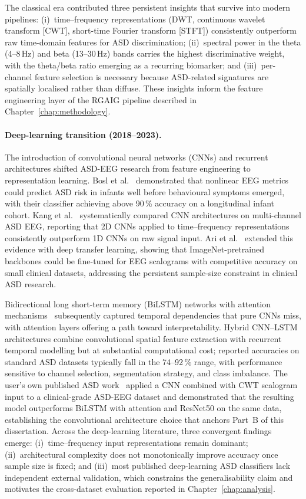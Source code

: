 The classical era contributed three persistent insights that survive into modern pipelines: (i)~time--frequency representations (DWT, continuous wavelet transform [CWT], short-time Fourier transform [STFT]) consistently outperform raw time-domain features for ASD discrimination; (ii)~spectral power in the theta (4--8\,Hz) and beta (13--30\,Hz) bands carries the highest discriminative weight, with the theta/beta ratio emerging as a recurring biomarker; and (iii)~per-channel feature selection is necessary because ASD-related signatures are spatially localised rather than diffuse. These insights inform the feature engineering layer of the RGAIG pipeline described in Chapter~\ref{chap:methodology}.

\paragraph{Deep-learning transition (2018--2023).}
The introduction of convolutional neural networks (CNNs) and recurrent architectures shifted ASD-EEG research from feature engineering to representation learning. Bosl et al.~\cite{bosl2018eeg} demonstrated that nonlinear EEG metrics could predict ASD risk in infants well before behavioural symptoms emerged, with their classifier achieving above 90\,\% accuracy on a longitudinal infant cohort. Kang et al.~\cite{kang2020asd} systematically compared CNN architectures on multi-channel ASD EEG, reporting that 2D CNNs applied to time--frequency representations consistently outperform 1D CNNs on raw signal input. Ari et al.~\cite{ari2022asd} extended this evidence with deep transfer learning, showing that ImageNet-pretrained backbones could be fine-tuned for EEG scalograms with competitive accuracy on small clinical datasets, addressing the persistent sample-size constraint in clinical ASD research.

Bidirectional long short-term memory (BiLSTM) networks with attention mechanisms~\cite{ahmad2020eeg} subsequently captured temporal dependencies that pure CNNs miss, with attention layers offering a path toward interpretability. Hybrid CNN--LSTM architectures combine convolutional spatial feature extraction with recurrent temporal modelling but at substantial computational cost; reported accuracies on standard ASD datasets typically fall in the 74--92\,\% range, with performance sensitive to channel selection, segmentation strategy, and class imbalance. The user's own published ASD work~\cite{asthana2025asd} applied a CNN combined with CWT scalogram input to a clinical-grade ASD-EEG dataset and demonstrated that the resulting model outperforms BiLSTM with attention and ResNet50 on the same data, establishing the convolutional architecture choice that anchors Part~B of this dissertation. Across the deep-learning literature, three convergent findings emerge: (i)~time--frequency input representations remain dominant; (ii)~architectural complexity does not monotonically improve accuracy once sample size is fixed; and (iii)~most published deep-learning ASD classifiers lack independent external validation, which constrains the generalisability claim and motivates the cross-dataset evaluation reported in Chapter~\ref{chap:analysis}.


